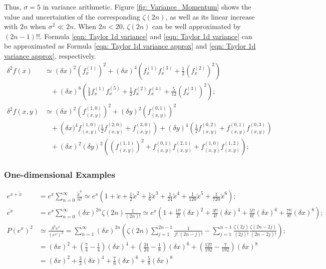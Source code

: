\documentclass[twoside]{article}
\numberwithin{equation}{section}
\newcommand{\eqspace}{\;\;\;}
\begin{document}
Thus, $\sigma = 5$ in variance arithmetic.  
Figure \ref{fig: Variance_Momentum} shows the value and uncertainties of the corresponding $\zeta(2n)$, as well as its linear increase with $2n$ when $\sigma^2 \ll 2n$.
When $2n < 20$, $\zeta(2n)$ can be well approximated by $(2n -1)!!$.  
Formula \eqref{eqn: Taylor 1d variance} and \eqref{eqn: Taylor 1d variance} can be approximated as Formula \eqref{eqn: Taylor 1d variance approx} and \eqref{eqn: Taylor 1d variance approx}, respectively.
\begin{align}
\label{eqn: Taylor 1d variance approx}
\delta^2 f(x) &\simeq (\delta x)^2 (f^{(1)}_x)^2 + (\delta x)^4 \left(f^{(1)}_x f^{(3)}_x + \frac{1}{2} (f^{(2)}_x)^2 \right) \\
  &\eqspace + (\delta x)^6 \left(\frac{1}{4} f^{(1)}_x f^{(5)}_x + \frac{1}{2} f^{(2)}_x f^{(4)}_x + \frac{5}{12} (f^{(3)}_x)^2 \right); \nonumber \\
\label{eqn: Taylor 2d variance approx}
\delta^2 f(x, y)&\simeq (\delta x)^2 (f^{(1,0)}_{(x,y)})^2 + (\delta y)^2 (f^{(0,1)}_{(x,y)})^2 \\
&\eqspace + \left(\delta x)^4 f^{(1,0)}_{(x,y)} (\frac{1}{2} f^{(2,0)}_{(x,y)} + f^{(3,0)}_{(x,y)}\right)
      + (\delta y)^4 \left(\frac{1}{2} f^{(0,2)}_{(x,y)} + f^{(0,1)}_{(x,y)} f^{(0,3)}_{(x,y)}\right) \nonumber \\
&\eqspace + (\delta x)^2 (\delta y)^2 \left((f^{(1,1)}_{(x,y)})^2 + f^{(0,1)}_{(x,y)} f^{(2,1)}_{(x,y)} + f^{(1,0)}_{(x,y)} f^{(1,2)}_{(x,y)}\right); \nonumber
\end{align}


\subsubsection{One-dimensional Examples}

\iffalse

\begin{align*}
e^{x + \tilde{x}} &= e^x \sum_{n=0}^{\infty} \frac{\tilde{x}^n}{n!}
 \simeq e^x \left(1 + \tilde{x} + \frac{1}{2} \tilde{x}^2 + \frac{1}{6} \tilde{x}^3 + \frac{1}{24} \tilde{x}^4 + \frac{1}{120} \tilde{x}^5 + \frac{1}{720} \tilde{x}^6 \right); \\
\overline{e^x} &= e^x \sum_{n=0}^{\infty} (\delta x)^{2n} \zeta(2n) \frac{1}{(2n)!} 
 \simeq e^x \left(1 + \frac{1!!}{2!} (\delta x)^2 + \frac{3!!}{4!} (\delta x)^4 + \frac{5!!}{6!} (\delta x)^6 + \frac{7!!}{8!} (\delta x)^8 \right); \\
P(e^x)^2 &\simeq \frac{\delta^2 e^x}{(e^x)^2} =  \sum_{n=1}^{\infty} (\delta x)^{2n} \left( \zeta(2n) \sum_{j=1}^{2n-1} \frac{1}{j!\;(2n - j)!} 
   	- \sum_{j=1}^{n-1} \frac{\zeta(2j)}{(2j)!}  \frac{\zeta(2n - 2j)}{(2n - 2j)!} \right); \\
 &= (\delta x)^2 + (\frac{7}{4} - \frac{1}{4}) (\delta x)^4 + (\frac{31}{24} - \frac{1}{8}) (\delta x)^6
  + (\frac{127}{192} - \frac{7}{192}) (\delta x)^8 \\
 &= (\delta x)^2 + \frac{3}{2} (\delta x)^4 + \frac{7}{6} (\delta x)^6 + \frac{5}{8} (\delta x)^8
\end{align*}
\end{document}
